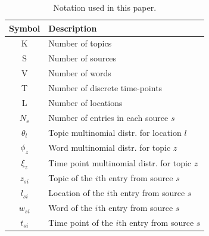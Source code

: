 \documentclass[twoside,leqno,twocolumn]{article}
\begin{document}
\begin{table}[h]
\small \centering
\captionsetup{font=small}
\caption{Notation used in this paper.}
\begin{tabular}{c l}
\hline
{\bf Symbol} & {\bf Description}  \\
\hline
K & Number of topics  \\
S & Number of sources \\
V & Number of words \\
T & Number of discrete time-points \\
L & Number of locations \\
$N_s$ & Number of entries in each source $s$\\
$\theta_l$ & Topic multinomial distr. for location $l$\\
$\phi_z$ & Word multinomial distr. for topic $z$\\
$\xi_z$ & Time point multinomial distr. for topic $z$\\
$z_{si}$ & Topic of the $i$th entry from source $s$ \\
$l_{si}$ & Location of the $i$th entry from source $s$ \\
$w_{si}$ & Word of the $i$th entry from source $s$ \\
$t_{si}$ & Time point of the $i$th entry from source $s$ \\
\hline
\end{tabular}
\vspace{-5pt}
\label{tab:notation}
\end{table}
\end{document}
